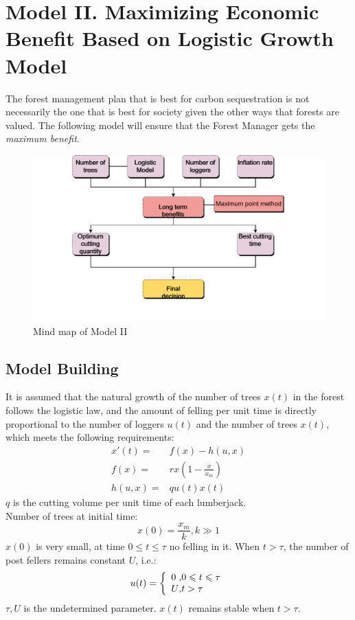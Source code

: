 \documentclass[12pt]{article}
\begin{document}
\section{Model II. Maximizing Economic Benefit Based on Logistic Growth Model}
The forest management plan that is best for carbon sequestration is not
necessarily the one that is best for society given the other ways that forests
are valued. The following model will ensure that the Forest Manager gets the
\emph{maximum benefit}.
\begin{figure}[htb]
    \centering
    \includegraphics[width=18cm]{Model II.pdf}
    \caption{Mind map of Model II}
\end{figure}
\subsection{Model Building}
It is assumed that the natural growth of the number of trees $x(t)$ in the
forest follows the logistic law, and the amount of felling per unit time is
directly proportional to the number of loggers $u(t)$ and the number of trees
$x(t)$, which meets the following requirements:
\begin{align}
    x'(t)=  & f(x)-h(u,x)         \\
    f(x)=   & rx(1-\frac{x}{x_m}) \\
    h(u,x)= & qu(t)x(t)
\end{align}
$q$ is the cutting volume per unit time of each lumberjack.\\
Number of trees at initial time:
\begin{equation}
    x(0)=\frac{x_m}{k},k\gg1 \label{m4}
\end{equation}
$x(0)$ is very small, at time $0 \leqslant t \leqslant \tau$ no felling in it.
When $t>\tau$, the number of post fellers remains constant $U$, i.e.:
\begin{align}
    u(t)=\left\{
    \begin{array}{l@{,}l}
        0 & 0\leqslant t\leqslant \tau \\
        U & t > \tau
    \end{array}
    \right.
    \label{m5}
\end{align}
$\tau, U$ is the undetermined parameter. $x(t)$ remains stable when $t > \tau$.
\end{document}
